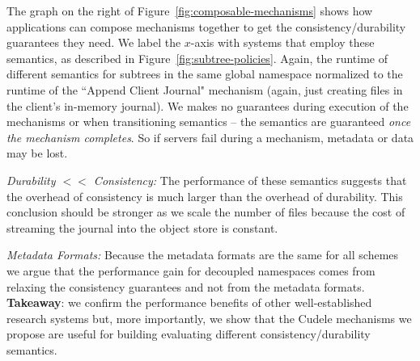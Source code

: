
The graph on the right of Figure~\ref{fig:composable-mechanisms} shows how
applications can compose mechanisms together to get the consistency/durability
guarantees they need.  We label the \(x\)-axis with systems that employ these
semantics, as described in Figure~\ref{fig:subtree-policies}.  Again, the
runtime of different semantics for subtrees in the same global namespace
normalized to the runtime of the ``Append Client Journal" mechanism (again,
just creating files in the client's in-memory journal).  We makes no guarantees
during execution of the mechanisms or when transitioning semantics -- the
semantics are guaranteed {\it once the mechanism completes}. So if servers fail
during a mechanism, metadata or data may be lost.


{\it Durability \(<<\) Consistency:} The performance of these semantics
suggests that the overhead of consistency is much larger than the overhead of
durability. This conclusion should be stronger as we scale the number of files
because the cost of streaming the journal into the object store is constant.

{\it Metadata Formats:} Because the metadata formats are the same for
all schemes we argue that the performance gain for decoupled namespaces comes
from relaxing the consistency guarantees and not from the metadata formats.\\

\noindent\textbf{Takeaway}: we confirm the performance benefits of other
well-established research systems but, more importantly, we show that the
Cudele mechanisms we propose are useful for building evaluating different
consistency/durability semantics.

